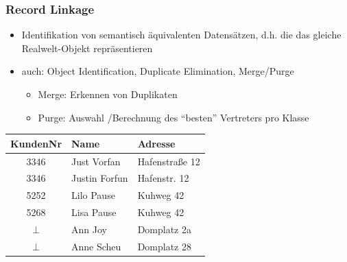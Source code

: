     \begin{frame}
    \frametitle{Record Linkage}
    
    \begin{itemize}
    \item Identifikation von semantisch äquivalenten Datensätzen, d.h. die
      das gleiche Realwelt-Objekt repräsentieren
    \item auch: Object Identification, Duplicate Elimination, Merge/Purge
    \begin{itemize}
    \item Merge: Erkennen von Duplikaten
    \item Purge: Auswahl /Berechnung des "`besten"' Vertreters pro Klasse
    \end{itemize}
    \end{itemize}
    
    \begin{center}
    {\small\begin{tabular}{|c|l|l|}
    \hline
    \rowcolor{Gray} KundenNr & Name & Adresse \\
    \hline \hline
    3346 & Just Vorfan & Hafenstraße 12 \\
    3346 & Justin Forfun & Hafenstr. 12 \\
    \hline
    5252 & Lilo Pause & Kuhweg 42 \\
    5268 & Lisa Pause & Kuhweg 42 \\
    \hline
    $\perp$ & Ann Joy & Domplatz 2a \\
    $\perp$ & Anne Scheu & Domplatz 28 \\
    \hline
    \end{tabular}}
    \end{center}
    
    \end{frame}
    
